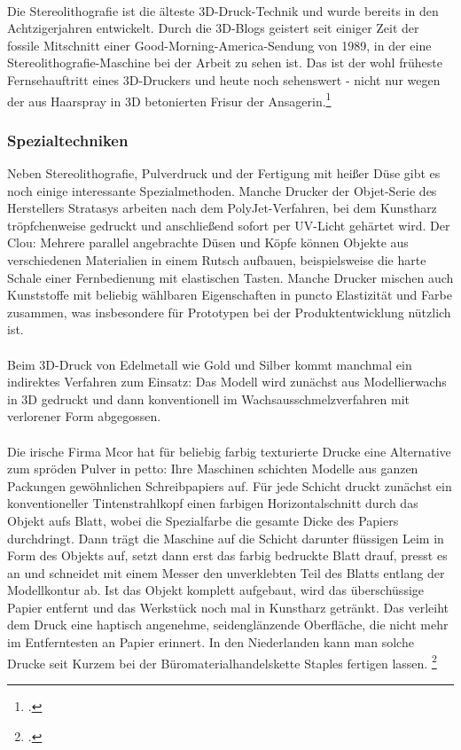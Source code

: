 \\
Die Stereolithografie ist die älteste 3D-Druck-Technik und wurde bereits in den Achtzigerjahren entwickelt. Durch die 3D-Blogs geistert seit einiger Zeit der fossile Mitschnitt einer Good-Morning-America-Sendung von 1989, in der eine Stereolithografie-Maschine bei der Arbeit zu sehen ist. Das ist der wohl früheste Fernsehauftritt eines 3D-Druckers und heute noch sehenswert - nicht nur wegen der aus Haarspray in 3D betonierten Frisur der Ansagerin.\footcite{shit_3d_spiegel}

\subsubsection{Spezialtechniken}

Neben Stereolithografie, Pulverdruck und der Fertigung mit heißer Düse gibt es noch einige interessante Spezialmethoden. Manche Drucker der Objet-Serie des Herstellers Stratasys arbeiten nach dem PolyJet-Verfahren, bei dem Kunstharz tröpfchenweise gedruckt und anschließend sofort per UV-Licht gehärtet wird. Der Clou: Mehrere parallel angebrachte Düsen und Köpfe können Objekte aus verschiedenen Materialien in einem Rutsch aufbauen, beispielsweise die harte Schale einer Fernbedienung mit elastischen Tasten. Manche Drucker mischen auch Kunststoffe mit beliebig wählbaren Eigenschaften in puncto Elastizität und Farbe zusammen, was insbesondere für Prototypen bei der Produktentwicklung nützlich ist.\\
\\
Beim 3D-Druck von Edelmetall wie Gold und Silber kommt manchmal ein indirektes Verfahren zum Einsatz: Das Modell wird zunächst aus Modellierwachs in 3D gedruckt und dann konventionell im Wachsausschmelzverfahren mit verlorener Form abgegossen.\\
\\
Die irische Firma Mcor hat für beliebig farbig texturierte Drucke eine Alternative zum spröden Pulver in petto: Ihre Maschinen schichten Modelle aus ganzen Packungen gewöhnlichen Schreibpapiers auf. Für jede Schicht druckt zunächst ein konventioneller Tintenstrahlkopf einen farbigen Horizontalschnitt durch das Objekt aufs Blatt, wobei die Spezialfarbe die gesamte Dicke des Papiers durchdringt. Dann trägt die Maschine auf die Schicht darunter flüssigen Leim in Form des Objekts auf, setzt dann erst das farbig bedruckte Blatt drauf, presst es an und schneidet mit einem Messer den unverklebten Teil des Blatts entlang der Modellkontur ab. Ist das Objekt komplett aufgebaut, wird das überschüssige Papier entfernt und das Werkstück noch mal in Kunstharz getränkt. Das verleiht dem Druck eine haptisch angenehme, seidenglänzende Oberfläche, die nicht mehr im Entferntesten an Papier erinnert. In den Niederlanden kann man solche Drucke seit Kurzem bei der Büromaterialhandelskette Staples fertigen lassen. \footcite{shit_3d_spiegel}
